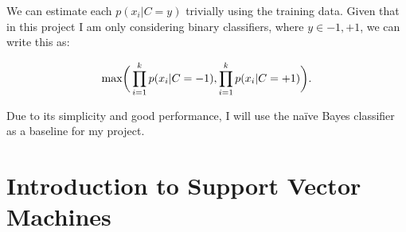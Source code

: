 \documentclass[12pt,a4paper,twoside,openright]{report}
\begin{document}
We can estimate each $p(x_i | C = y)$ trivially using the training data. Given that in this project I am only considering binary classifiers, where $y \in {-1, +1}$, we can write this as:

\begin{equation}
\text{max} \bigg( \displaystyle \prod_{i = 1}^{k}p(x_i | C = -1), \prod_{i = 1}^{k}p(x_i | C = +1) \bigg). \\
\end{equation}

Due to its simplicity and good performance, I will use the na\"{i}ve Bayes classifier as a baseline for my project.
\section{Introduction to Support Vector Machines} \label{prep-svm}
\end{document}
